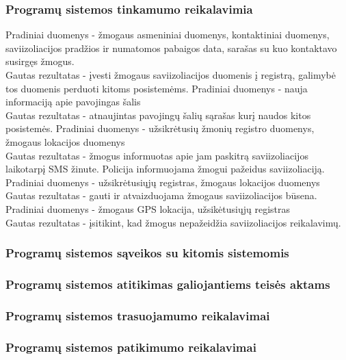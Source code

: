 \documentclass{VUMIFPSkursinis}
\begin{document}
	\subsubsection{Programų sistemos tinkamumo reikalavimia}
			Pradiniai duomenys - žmogaus asmeniniai duomenys, kontaktiniai duomenys, saviizoliacijos pradžios ir numatomos pabaigos data, sarašas su kuo kontaktavo susirgęs žmogus.
			\\
			Gautas rezultatas - įvesti žmogaus saviizoliacijos duomenis į registrą, galimybė tos duomenis perduoti kitoms posistemėms.
			Pradiniai duomenys - nauja informaciją apie pavojingas šalis
			\\
			Gautas rezultatas - atnaujintas pavojingų šalių sąrašas kurį naudos kitos posistemės.
			Pradiniai duomenys - užsikrėtusių žmonių registro duomenys, žmogaus lokacijos duomenys
			\\
			Gautas rezultatas - žmogus informuotas apie jam paskitrą saviizoliacijos laikotarpį SMS žinute. Policija informuojama žmogui pažeidus saviizoliaciją.
			Pradiniai duomenys - užsikrėtusiųjų registras, žmogaus lokacijos duomenys
			\\
			Gautas rezultatas - gauti ir atvaizduojama žmogaus saviizoliacijos būsena.
			Pradiniai duomenys - žmogaus GPS lokacija, užsikėtusiųjų registras
			\\
			Gautas rezultatas - įsitikint, kad žmogus nepažeidžia saviizoliacijos reikalavimų.
	\subsubsection{Programų sistemos sąveikos su kitomis sistemomis}
	\subsubsection{Programų sistemos atitikimas galiojantiems teisės aktams}
	\subsubsection{Programų sistemos trasuojamumo reikalavimai}
	\subsubsection{Programų sistemos patikimumo reikalavimai}
\end{document}
